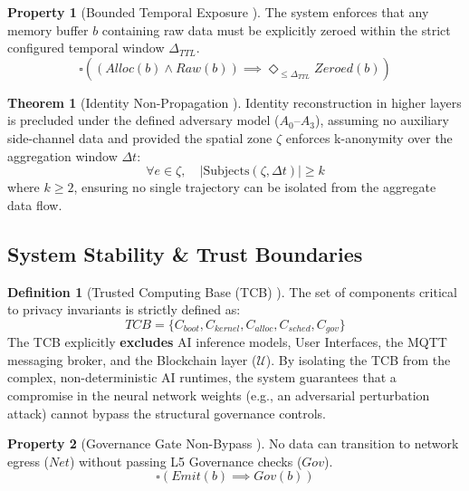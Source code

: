 \documentclass[conference]{IEEEtran}
\theoremstyle{definition}
\newtheorem{definition}{Definition}
\newtheorem{theorem}{Theorem}
\newtheorem{property}{Property}
\begin{document}
\begin{property}[Bounded Temporal Exposure \cite{P19}]
The system enforces that any memory buffer $b$ containing raw data must be explicitly zeroed within the strict configured temporal window $\Delta_{TTL}$.
\begin{equation}
\square \left( (Alloc(b) \land Raw(b)) \implies \Diamond_{\le \Delta_{TTL}} Zeroed(b) \right)
\end{equation}
\end{property}

\begin{theorem}[Identity Non-Propagation \cite{P9}]
Identity reconstruction in higher layers is precluded under the defined adversary model ($A_0$--$A_3$), assuming no auxiliary side-channel data and provided the spatial zone $\zeta$ enforces k-anonymity over the aggregation window $\Delta t$:
\begin{equation}
\forall e \in \zeta, \quad |\text{Subjects}(\zeta, \Delta t)| \ge k
\end{equation}
where $k \ge 2$, ensuring no single trajectory can be isolated from the aggregate data flow.
\end{theorem}

\subsection{System Stability \& Trust Boundaries}

\begin{definition}[Trusted Computing Base (TCB) \cite{P19}]
The set of components critical to privacy invariants is strictly defined as:
\begin{equation}
TCB = \{ C_{boot}, C_{kernel}, C_{alloc}, C_{sched}, C_{gov} \}
\end{equation}
The TCB explicitly \textbf{excludes} AI inference models, User Interfaces, the MQTT messaging broker, and the Blockchain layer ($\mathcal{U}$). By isolating the TCB from the complex, non-deterministic AI runtimes, the system guarantees that a compromise in the neural network weights (e.g., an adversarial perturbation attack) cannot bypass the structural governance controls.
\end{definition}

\begin{property}[Governance Gate Non-Bypass \cite{P9}]
No data can transition to network egress ($Net$) without passing L5 Governance checks ($Gov$).
\begin{equation}
\square \left( Emit(b) \implies Gov(b) \right)
\end{equation}
\end{property}
\end{document}
